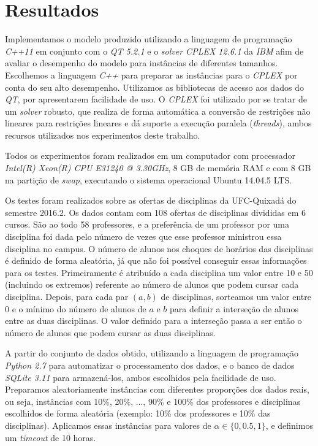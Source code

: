 \chapter{Resultados}
\label{chap:resultados}

Implementamos o modelo produzido utilizando a linguagem de programação \textit{C++11} \cite{c++} em conjunto com o \textit{QT 5.2.1} \cite{qt} e o \textit{solver CPLEX 12.6.1} da \textit{IBM} \cite{ibmcplex} afim de avaliar o desempenho do modelo para instâncias de diferentes tamanhos. Escolhemos a linguagem \textit{C++} para preparar as instâncias para o \textit{CPLEX} por conta do seu alto desempenho. Utilizamos as bibliotecas de acesso aos dados do \textit{QT}, por apresentarem facilidade de uso. O \textit{CPLEX} foi utilizado por se tratar de um \textit{solver} robusto, que realiza de forma automática a conversão de restrições não lineares para restrições lineares e dá suporte a execução paralela (\textit{threads}), ambos recursos utilizados nos experimentos deste trabalho.

Todos os experimentos foram realizados em um computador com processador \textit{Intel(R) Xeon(R) CPU E31240 @ 3.30GHz}, 8 GB de memória RAM e com 8 GB na partição de \textit{swap}, executando o sistema operacional Ubuntu 14.04.5 LTS.

Os testes foram realizados sobre as ofertas de disciplinas da UFC-Quixadá do semestre 2016.2. Os dados contam com 108 ofertas de disciplinas divididas em 6 cursos. São ao todo 58 professores, e a preferência de um professor por uma disciplina foi dada pelo número de vezes que esse professor ministrou essa disciplina no campus. O número de alunos nos choques de horários das disciplinas é definido de forma aleatória, já que não foi possível conseguir essas informações para os testes. Primeiramente é atribuído a cada disciplina um valor entre 10 e 50 (incluindo os extremos) referente ao número de alunos que podem cursar cada disciplina. Depois, para cada par $(a, b)$ de disciplinas, sorteamos um valor entre 0 e o mínimo do número de alunos de $a$ e $b$ para definir a interseção de alunos entre as duas disciplinas. O valor definido para a interseção passa a ser então o número de alunos que podem cursar as duas disciplinas.

A partir do conjunto de dados obtido, utilizando a linguagem de programação \textit{Python 2.7} \cite{python} para automatizar o processamento dos dados, e o banco de dados \textit{SQLite 3.11} \cite{sqlite} para armazená-los, ambos escolhidos pela facilidade de uso. Preparamos aleatoriamente instâncias com diferentes proporções dos dados reais, ou seja, instâncias com 10\%, 20\%, ..., 90\% e 100\% dos professores e disciplinas escolhidos de forma aleatória (exemplo: 10\% dos professores e 10\% das disciplinas). Aplicamos essas instâncias para valores de $\alpha \in{\{0, 0.5, 1\}}$, e definimos um \textit{timeout} de 10 horas.

